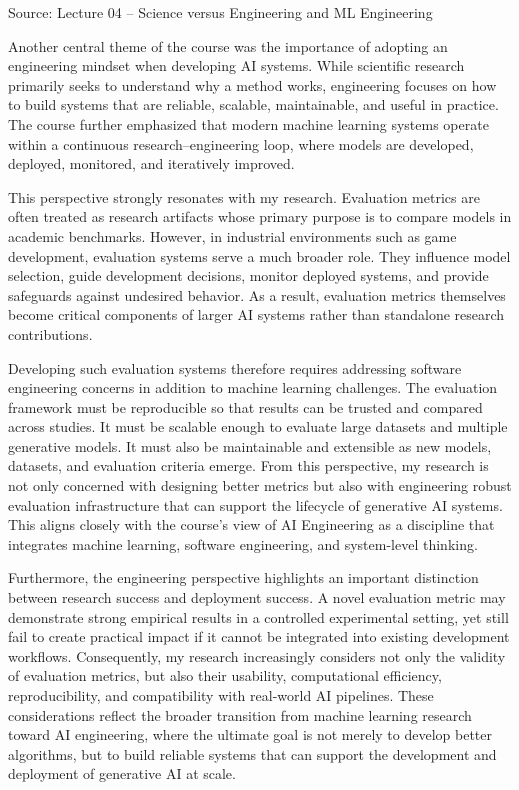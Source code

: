 \documentclass{article}
\begin{document}
Source: Lecture 04 -- Science versus Engineering and ML Engineering

Another central theme of the course was the importance of adopting an engineering mindset when developing AI systems. While scientific research primarily seeks to understand why a method works, engineering focuses on how to build systems that are reliable, scalable, maintainable, and useful in practice. The course further emphasized that modern machine learning systems operate within a continuous research--engineering loop, where models are developed, deployed, monitored, and iteratively improved.

This perspective strongly resonates with my research. Evaluation metrics are often treated as research artifacts whose primary purpose is to compare models in academic benchmarks. However, in industrial environments such as game development, evaluation systems serve a much broader role. They influence model selection, guide development decisions, monitor deployed systems, and provide safeguards against undesired behavior. As a result, evaluation metrics themselves become critical components of larger AI systems rather than standalone research contributions.

Developing such evaluation systems therefore requires addressing software engineering concerns in addition to machine learning challenges. The evaluation framework must be reproducible so that results can be trusted and compared across studies. It must be scalable enough to evaluate large datasets and multiple generative models. It must also be maintainable and extensible as new models, datasets, and evaluation criteria emerge. From this perspective, my research is not only concerned with designing better metrics but also with engineering robust evaluation infrastructure that can support the lifecycle of generative AI systems. This aligns closely with the course's view of AI Engineering as a discipline that integrates machine learning, software engineering, and system-level thinking.

Furthermore, the engineering perspective highlights an important distinction between research success and deployment success. A novel evaluation metric may demonstrate strong empirical results in a controlled experimental setting, yet still fail to create practical impact if it cannot be integrated into existing development workflows. Consequently, my research increasingly considers not only the validity of evaluation metrics, but also their usability, computational efficiency, reproducibility, and compatibility with real-world AI pipelines. These considerations reflect the broader transition from machine learning research toward AI engineering, where the ultimate goal is not merely to develop better algorithms, but to build reliable systems that can support the development and deployment of generative AI at scale.
\end{document}
